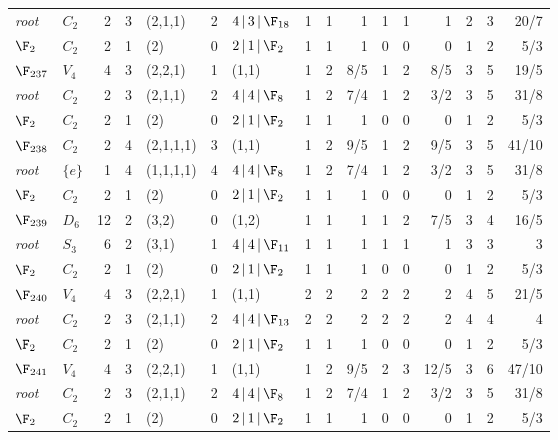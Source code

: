 \begin{landscape}
{\begin{longtable}{@{}l l r r l r l rrr rrr rrr@{}}
\quad\textit{root} & $C_{2}$ & 2 & 3 & (2,1,1) & 2 & $4\,|\,3\,|\,\F_{18}$ & 1 & 1 & 1 & 1 & 1 & 1 & 2 & 3 & 20/7 \\
\quad$\F_{2}$ & $C_{2}$ & 2 & 1 & (2) & 0 & $2\,|\,1\,|\,\F_{2}$ & 1 & 1 & 1 & 0 & 0 & 0 & 1 & 2 & 5/3 \\
\addlinespace[3pt]
\textbf{$\F_{237}$} & $V_{4}$ & 4 & 3 & (2,2,1) & 1 & (1,1) & 1 & 2 & 8/5 & 1 & 2 & 8/5 & 3 & 5 & 19/5 \\
\quad\textit{root} & $C_{2}$ & 2 & 3 & (2,1,1) & 2 & $4\,|\,4\,|\,\F_{8}$ & 1 & 2 & 7/4 & 1 & 2 & 3/2 & 3 & 5 & 31/8 \\
\quad$\F_{2}$ & $C_{2}$ & 2 & 1 & (2) & 0 & $2\,|\,1\,|\,\F_{2}$ & 1 & 1 & 1 & 0 & 0 & 0 & 1 & 2 & 5/3 \\
\addlinespace[3pt]
\textbf{$\F_{238}$} & $C_{2}$ & 2 & 4 & (2,1,1,1) & 3 & (1,1) & 1 & 2 & 9/5 & 1 & 2 & 9/5 & 3 & 5 & 41/10 \\
\quad\textit{root} & $\{e\}$ & 1 & 4 & (1,1,1,1) & 4 & $4\,|\,4\,|\,\F_{8}$ & 1 & 2 & 7/4 & 1 & 2 & 3/2 & 3 & 5 & 31/8 \\
\quad$\F_{2}$ & $C_{2}$ & 2 & 1 & (2) & 0 & $2\,|\,1\,|\,\F_{2}$ & 1 & 1 & 1 & 0 & 0 & 0 & 1 & 2 & 5/3 \\
\addlinespace[3pt]
\textbf{$\F_{239}$} & $D_{6}$ & 12 & 2 & (3,2) & 0 & (1,2) & 1 & 1 & 1 & 1 & 2 & 7/5 & 3 & 4 & 16/5 \\
\quad\textit{root} & $S_{3}$ & 6 & 2 & (3,1) & 1 & $4\,|\,4\,|\,\F_{11}$ & 1 & 1 & 1 & 1 & 1 & 1 & 3 & 3 & 3 \\
\quad$\F_{2}$ & $C_{2}$ & 2 & 1 & (2) & 0 & $2\,|\,1\,|\,\F_{2}$ & 1 & 1 & 1 & 0 & 0 & 0 & 1 & 2 & 5/3 \\
\addlinespace[3pt]
\textbf{$\F_{240}$} & $V_{4}$ & 4 & 3 & (2,2,1) & 1 & (1,1) & 2 & 2 & 2 & 2 & 2 & 2 & 4 & 5 & 21/5 \\
\quad\textit{root} & $C_{2}$ & 2 & 3 & (2,1,1) & 2 & $4\,|\,4\,|\,\F_{13}$ & 2 & 2 & 2 & 2 & 2 & 2 & 4 & 4 & 4 \\
\quad$\F_{2}$ & $C_{2}$ & 2 & 1 & (2) & 0 & $2\,|\,1\,|\,\F_{2}$ & 1 & 1 & 1 & 0 & 0 & 0 & 1 & 2 & 5/3 \\
\addlinespace[3pt]
\textbf{$\F_{241}$} & $V_{4}$ & 4 & 3 & (2,2,1) & 1 & (1,1) & 1 & 2 & 9/5 & 2 & 3 & 12/5 & 3 & 6 & 47/10 \\
\quad\textit{root} & $C_{2}$ & 2 & 3 & (2,1,1) & 2 & $4\,|\,4\,|\,\F_{8}$ & 1 & 2 & 7/4 & 1 & 2 & 3/2 & 3 & 5 & 31/8 \\
\quad$\F_{2}$ & $C_{2}$ & 2 & 1 & (2) & 0 & $2\,|\,1\,|\,\F_{2}$ & 1 & 1 & 1 & 0 & 0 & 0 & 1 & 2 & 5/3 \\

\end{longtable}}
\end{landscape}
